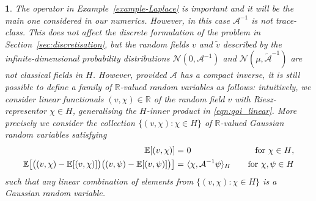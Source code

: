 \documentclass[11pt,english]{article}
\theoremstyle{plain}
\theoremstyle{plain}
\theoremstyle{plain}
\theoremstyle{plain}
\newtheorem{rem}[thm]{\protect\remarkname}
\numberwithin{equation}{section}
\providecommand{\remarkname}{Remark}
\begin{document}
\begin{rem}\label{rem:trace_class}
	The operator in Example~\ref{example-Laplace} is important and
        it will be the main one considered in our
        numerics. However, in this case $\mathcal{A}^{-1}$ is not
        trace-class. This does not affect the discrete
        formulation of the problem in
        Section~\ref{sec:discretisation}, but the random fields $v$
        and $\widetilde v$
        described by the infinite-dimensional  probability
        distributions $\mathcal{N}(0,\mathcal{A}^{-1})$ and
        $\mathcal{N}(\mu,\widetilde{\mathcal{A}}^{-1})$ are not
        classical fields in $H$. However, provided $\mathcal{A}$ has a compact
        inverse, it is still possible to define a family of $\mathbb{R}$-valued
        random variables as follows: intuitively, we consider linear functionals
        $(v,\chi) \in \mathbb{R}$ of the random field $v$ with Riesz-representor $\chi \in H$,
        generalising the $H$-inner product in \eqref{eqn:qoi_linear}. More
        precisely we
        consider the collection $\{(v,\chi) : \chi \in H\}$
of $\mathbb{R}$-valued Gaussian random variables satisfying 
\begin{align}
\mathbb{E}[(v ,\chi)] = & \ 0 \quad &\text{for \ensuremath{\chi\in H}},\label{eq:generalised-mean}\\
\mathbb{E}\bigl[\bigl((v ,\chi)-\mathbb{E}[(v ,\chi)]\bigr)\bigl((v
  ,\psi)-\mathbb{E}[(v ,\psi)]\bigr)\bigr] = & \ \langle
                                                    \chi,\mathcal{A}^{-1}\psi\rangle_{H}\quad
                                                    &\text{for \ensuremath{\chi,\psi\in H}}\label{eq:generalised-cov}
\end{align}
such that any linear combination of elements from $\{(v,\chi) :\chi\in H\}$ is a Gaussian random variable. 


\end{rem}
\end{document}
